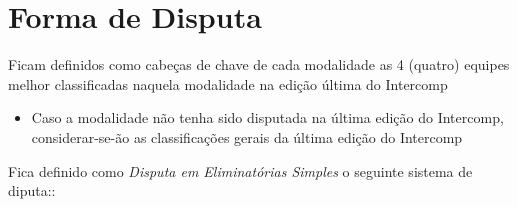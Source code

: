 {\let\clearpage\relax \chapter{Forma de Disputa}}

\noindent
Ficam definidos como cabeças de chave de cada modalidade as 4 (quatro) equipes melhor classificadas naquela modalidade na edição última do Intercomp
\begin{itemize}[noitemsep]
	\item Caso a modalidade não tenha sido disputada na última edição do Intercomp, considerar-se-ão as classificações gerais da última edição do Intercomp
\end{itemize}

\noindent
Fica definido como \textit{Disputa em Eliminatórias Simples} o seguinte sistema de diputa::
